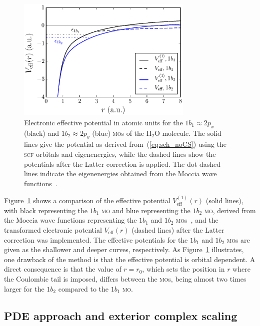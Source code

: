 \begin{figure}
  \centering
  \includegraphics[width=0.75\textwidth]{figures/ch_H2O/1b1_1b2/Veff1b11b2.eps}
  \caption{Electronic effective potential in atomic units for the
    $1b_{1}\approx 2p_{x}$ (black) and $1b_{2}\approx 2p_{y}$ (blue)
    \textsc{mo}s of the H$_{2}$O molecule. The solid lines give the
    potential as derived from~(\ref{eq:sch_noCS}) using the
    \textsc{scf} orbitals and eigenenergies, while the dashed lines
    show the potentials after the Latter correction is applied. The
    dot-dashed lines indicate the eigenenergies obtained from the
    Moccia wave functions~\cite{Moccia_1964}.}
  \label{fig:Veff1b11b2}
\end{figure}

Figure~\ref{fig:Veff1b11b2} shows a comparison of the effective
potential $V_{\mathrm{eff}}^{(1)}(r)$ (solid lines), with black
representing the $1b_{1}$ \textsc{mo} and blue representing the
$1b_{2}$ \textsc{mo}, derived from the Moccia wave functions
representing the $1b_{1}$ and $1b_{2}$
\textsc{mo}s~\cite{Moccia_1964}, and the transformed electronic
potential $V_{\mathrm{eff}}(r)$ (dashed lines) after the Latter
correction was implemented. The effective potentials for the $1b_{1}$
and $1b_{2}$ \textsc{mo}s are given as the shallower and deeper
curves, respectively. As Figure~\ref{fig:Veff1b11b2} illustrates, one
drawback of the method is that the effective potential is orbital
dependent. A direct consequence is that the value of $r=r_{0}$, which
sets the position in $r$ where the Coulombic tail is imposed, differs
between the \textsc{mo}s, being almost two times larger for the
$1b_{2}$ compared to the $1b_{1}$ \textsc{mo}.


\subsection{PDE approach and exterior complex scaling}
\label{ch:ecs_1b11b2}

